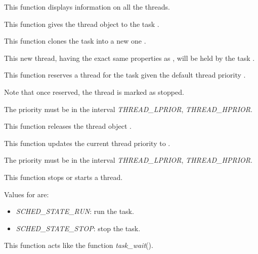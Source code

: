 \begin{itemize}
	 {
	   This function displays information on all the threads.
	 }

	 {
	   This function gives the thread object  to the
	   task .
	 }

	 {
	   This function clones the task  into a new one
	   .

	   This new thread, having the exact same properties as ,
	   will be held by the task .
	 }

	 {
	   This function reserves a thread for the task 
	   given the default thread priority .

	   Note that once reserved, the thread is marked as stopped.

	   The priority must be in the interval \emph{THREAD\_LPRIOR},
	   \emph{THREAD\_HPRIOR}.
	 }

	 {
	   This function releases the thread object .
	 }

	 {
	   This function updates the current thread priority
	   to .

	   The priority must be in the interval \emph{THREAD\_LPRIOR},
	   \emph{THREAD\_HPRIOR}.
	 }

	 {
	   This function stops or starts a thread.

	   Values for  are:

	   \begin{itemize}
	     \item
	       \emph{SCHED\_STATE\_RUN}: run the task.
	     \item
	       \emph{SCHED\_STATE\_STOP}: stop the task.
	   \end{itemize}
	 }

	 {
	   This function acts like the function \emph{task\_wait}().

}
\end{itemize}
